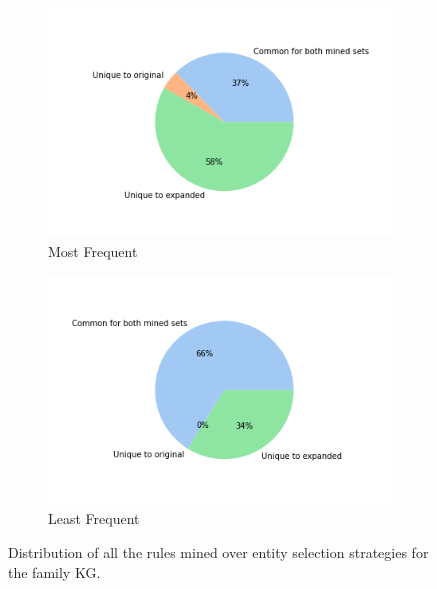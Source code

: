 \begin{figure}[htb]
        \begin{subfigure}[b]{0.49\textwidth}   
            \centering 
            \includegraphics[width=\textwidth]{figures/results/entity_selection/pie_charts/most_frequent_family.png}
            \caption[]%
            {{\small Most Frequent}}    
            \label{fig:most_pie_family}
        \end{subfigure}
        \hfill
        \begin{subfigure}[b]{0.49\textwidth}   
            \centering 
            \includegraphics[width=\textwidth]{figures/results/entity_selection/pie_charts/least_frequent_family.png}
            \caption[]%
            {{\small Least Frequent}}    
            \label{fig:least_pie_family}
        \end{subfigure}
        \caption[]
        {\small Distribution of all the rules mined over entity selection strategies for the family KG.} 
        \label{fig:entity_pies_family}
    \end{figure}

